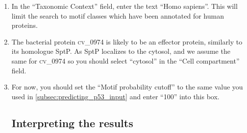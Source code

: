 \documentclass[12pt]{article}
\newcommand\uniprot[1]{%
	\textsc{\lowercase{#1}}%
}
\begin{document}
\begin{enumerate}
	\item \label{subsec:predicting_cv_0974_search_taxon} In the ``Taxonomic Context'' field, enter the text ``Homo
		sapiens''. This will limit the search to motif classes
		which have been annotated for human proteins.


	\item \label{subsec:predicting_cv_0974_search_compartment} The bacterial protein \uniprot{CV\_0974} is likely to be an effector protein, similarly to its
	    homologue SptP. As SptP localizes to the cytosol, and we assume the same
	    for \uniprot{CV\_0974} so you should select ``cytosol'' in the ``Cell compartment''
	    field.

	\item \label{subsec:predicting_cv_0974_search_cutoff} For now, you should set
	    the ``Motif probability cutoff'' to the same value you used in
		\ref{subsec:predicting_p53_input} and enter ``100'' into this box.

	\subsection*{Interpreting the results}
	\label{subsec:predicting_cv_0974_submitting}


\end{enumerate}
\end{document}
